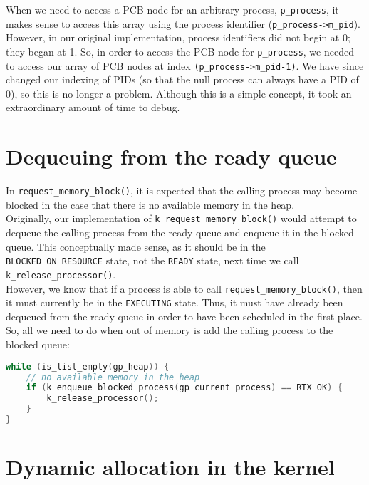 \documentclass[12pt]{report}
\begin{document}
When we need to access a PCB node for an arbitrary process, \texttt{p_process}, it makes sense to access this array using the process identifier (\texttt{p_process->m_pid}). However, in our original implementation, process identifiers did not begin at 0; they began at 1. So, in order to access the PCB node for \texttt{p_process}, we needed to access our array of PCB nodes at index \texttt{(p_process->m_pid-1)}. We have since changed our indexing of PIDs (so that the null process can always have a PID of 0), so this is no longer a problem. Although this is a simple concept, it took an extraordinary amount of time to debug.

\section{Dequeuing from the ready queue}

In \texttt{request_memory_block()}, it is expected that the calling process may become blocked in the case that there is no available memory in the heap.\\

Originally, our implementation of \texttt{k_request_memory_block()} would attempt to dequeue the calling process from the ready queue and enqueue it in the blocked queue. This conceptually made sense, as it should be in the \texttt{BLOCKED_ON_RESOURCE} state, not the \texttt{READY} state, next time we call \texttt{k_release_processor()}.\\

However, we know that if a process is able to call \texttt{request_memory_block()}, then it must currently be in the \texttt{EXECUTING} state. Thus, it must have already been dequeued from the ready queue in order to have been scheduled in the first place. So, all we need to do when out of memory is add the calling process to the blocked queue:

\begin{minipage}{\textwidth}
\begin{lstlisting}[language=C]
while (is_list_empty(gp_heap)) {
    // no available memory in the heap
    if (k_enqueue_blocked_process(gp_current_process) == RTX_OK) {
        k_release_processor();
    }
}
\end{lstlisting}
\end{minipage}

\section{Dynamic allocation in the kernel}
\end{document}
